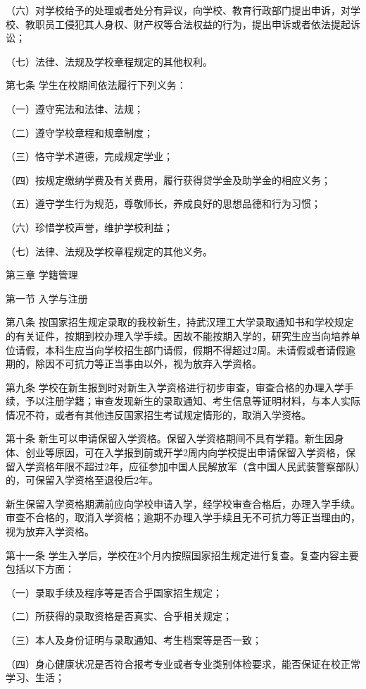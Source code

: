 \documentclass[UTF8,12pt,a4paper]{report}
\begin{document}
（六）对学校给予的处理或者处分有异议，向学校、教育行政部门提出申诉，对学校、教职员工侵犯其人身权、财产权等合法权益的行为，提出申诉或者依法提起诉讼；

（七）法律、法规及学校章程规定的其他权利。

第七条 学生在校期间依法履行下列义务：

（一）遵守宪法和法律、法规；

（二）遵守学校章程和规章制度；

（三）恪守学术道德，完成规定学业；

（四）按规定缴纳学费及有关费用，履行获得贷学金及助学金的相应义务；

（五）遵守学生行为规范，尊敬师长，养成良好的思想品德和行为习惯；

（六）珍惜学校声誉，维护学校利益；

（七）法律、法规及学校章程规定的其他义务。



第三章 学籍管理

第一节   入学与注册

第八条 按国家招生规定录取的我校新生，持武汉理工大学录取通知书和学校规定的有关证件，按期到校办理入学手续。因故不能按期入学的，研究生应当向培养单位请假，本科生应当向学校招生部门请假，假期不得超过2周。未请假或者请假逾期的，除因不可抗力等正当事由以外，视为放弃入学资格。

第九条 学校在新生报到时对新生入学资格进行初步审查，审查合格的办理入学手续，予以注册学籍；审查发现新生的录取通知、考生信息等证明材料，与本人实际情况不符，或者有其他违反国家招生考试规定情形的，取消入学资格。

第十条 新生可以申请保留入学资格。保留入学资格期间不具有学籍。新生因身体、创业等原因，可在入学报到前或开学2周内向学校提出申请保留入学资格，保留入学资格年限不超过2年，应征参加中国人民解放军（含中国人民武装警察部队）的，可保留入学资格至退役后2年。

新生保留入学资格期满前应向学校申请入学，经学校审查合格后，办理入学手续。审查不合格的，取消入学资格；逾期不办理入学手续且无不可抗力等正当理由的，视为放弃入学资格。

第十一条 学生入学后，学校在3个月内按照国家招生规定进行复查。复查内容主要包括以下方面：

（一）录取手续及程序等是否合乎国家招生规定；

（二）所获得的录取资格是否真实、合乎相关规定；

（三）本人及身份证明与录取通知、考生档案等是否一致；

（四）身心健康状况是否符合报考专业或者专业类别体检要求，能否保证在校正常学习、生活；
\end{document}
